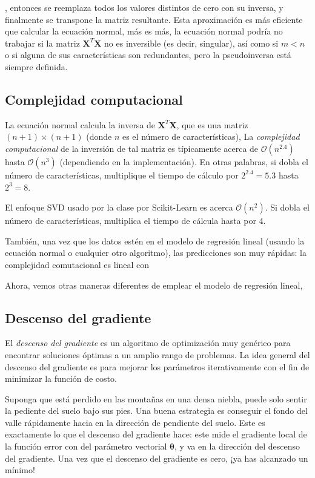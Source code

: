 , entonces se reemplaza todos los valores distintos de cero con su inversa, y finalmente se transpone la matriz resultante. Esta aproximación es más eficiente que calcular la ecuación normal, más %
es más, la ecuación normal podría no trabajar si la matriz $\bm{X}^{T}\bm{X}$ no es inversible (es decir, singular), así como si $m<n$ o si alguna de sus características son redundantes, pero la pseudoinversa está siempre definida.

\subsection{Complejidad computacional}
La ecuación normal calcula la inversa de $\bm{X}^{T}\bm{X}$, que es una matriz $\left(n+1\right)\times\left(n+1\right)$ (donde $n$ es el número de características), La \emph{complejidad computacional} de la inversión de tal matriz es típicamente acerca de $\mathcal{O}\left(n^{2.4}\right)$ hasta $\mathcal{O}\left(n^{3}\right)$ (dependiendo en la implementación). En otras palabras, si dobla el número de características, multiplique el tiempo de cálculo por %
$2^{2.4}=5.3$ hasta $2^{3}=8$.

El enfoque SVD usado por la clase  por Scikit-Learn es acerca $\mathcal{O}\left(n^{2}\right)$. Si dobla el número de características, multiplica el tiempo de cálcula hasta por $4$.

También, una vez que los datos estén en el modelo de regresión lineal (usando la ecuación normal o cualquier otro algoritmo), las predicciones son muy rápidas: la complejidad comutacional es lineal con %

Ahora, vemos otras maneras diferentes de emplear el modelo de regresión lineal, %
\subsection{Descenso del gradiente}
El \emph{descenso del gradiente} es un algoritmo de optimización muy genérico para encontrar soluciones óptimas a un amplio rango de problemas. La idea general del descenso del gradiente es para %
mejorar los parámetros iterativamente con el fin de minimizar la función de costo.

Suponga que está perdido en las montañas en una densa niebla, puede solo sentir la pediente del suelo bajo sus pies. Una buena estrategia es conseguir el fondo del valle rápidamente hacia en la dirección de pendiente del suelo. Este es exactamente lo que el descenso del gradiente hace: este mide el gradiente local de la función error con %
del parámetro vectorial $\bm{\theta}$, y va en la dirección del descenso del gradiente. Una vez que el descenso del gradiente es cero, ¡ya has alcanzado un mínimo!

